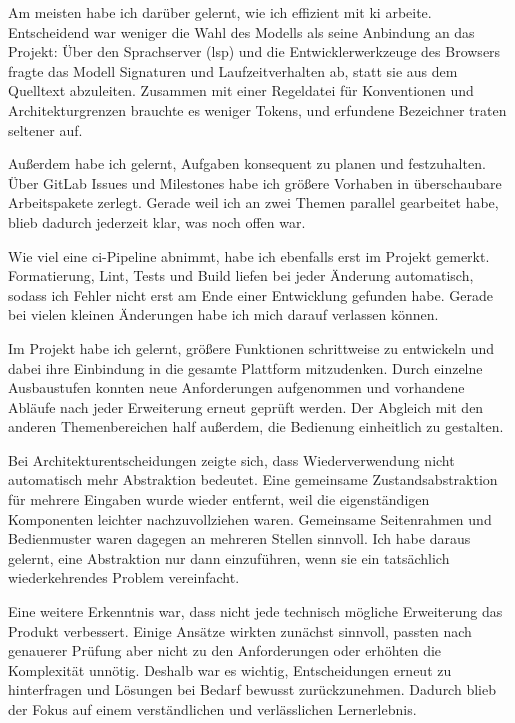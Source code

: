 Am meisten habe ich darüber gelernt, wie ich effizient
mit \gls{ki} arbeite.
Entscheidend war weniger die Wahl des Modells als seine Anbindung an das Projekt:
Über den Sprachserver (\gls{lsp}) und die Entwicklerwerkzeuge des Browsers fragte
das Modell Signaturen und Laufzeitverhalten ab, statt sie aus dem Quelltext
abzuleiten.
Zusammen mit einer Regeldatei für Konventionen und Architekturgrenzen brauchte es
weniger Tokens, und erfundene Bezeichner traten seltener auf.

Außerdem habe ich gelernt, Aufgaben konsequent zu planen und festzuhalten.
Über GitLab Issues und Milestones habe ich größere Vorhaben in überschaubare
Arbeitspakete zerlegt.
Gerade weil ich an zwei Themen parallel gearbeitet habe, blieb dadurch jederzeit
klar, was noch offen war.

Wie viel eine \gls{ci}-Pipeline abnimmt, habe ich ebenfalls erst im Projekt
gemerkt.
Formatierung, Lint, Tests und Build liefen bei jeder Änderung automatisch, sodass
ich Fehler nicht erst am Ende einer Entwicklung gefunden habe.
Gerade bei vielen kleinen Änderungen habe ich mich darauf verlassen können.

Im Projekt habe ich gelernt, größere Funktionen schrittweise zu entwickeln
und dabei ihre Einbindung in die gesamte Plattform mitzudenken. Durch einzelne
Ausbaustufen konnten neue Anforderungen aufgenommen und vorhandene Abläufe nach jeder
Erweiterung erneut geprüft werden. Der Abgleich mit den anderen Themenbereichen half
außerdem, die Bedienung einheitlich zu gestalten.

Bei Architekturentscheidungen zeigte sich, dass Wiederverwendung nicht automatisch mehr
Abstraktion bedeutet. Eine gemeinsame Zustandsabstraktion für mehrere Eingaben wurde
wieder entfernt, weil die eigenständigen Komponenten leichter nachzuvollziehen waren.
Gemeinsame Seitenrahmen und Bedienmuster waren dagegen an mehreren Stellen sinnvoll. Ich
habe daraus gelernt, eine Abstraktion nur dann einzuführen, wenn sie ein tatsächlich
wiederkehrendes Problem vereinfacht.

Eine weitere Erkenntnis war, dass nicht jede technisch mögliche Erweiterung das Produkt
verbessert. Einige Ansätze wirkten zunächst sinnvoll, passten nach genauerer Prüfung aber
nicht zu den Anforderungen oder erhöhten die Komplexität unnötig. Deshalb war es wichtig,
Entscheidungen erneut zu hinterfragen und Lösungen bei Bedarf bewusst zurückzunehmen.
Dadurch blieb der Fokus auf einem verständlichen und verlässlichen Lernerlebnis.


